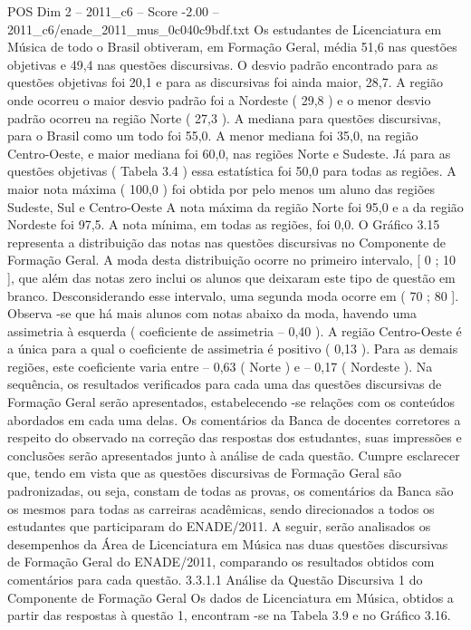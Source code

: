\begin{textsample}{POS Dim 2 – 2011\_c6 – Score -2.00 – 2011\_c6/enade\_2011\_mus\_0c040c9bdf.txt}
Os estudantes de Licenciatura em Música de todo o Brasil obtiveram, em Formação Geral, média 51,6 nas questões objetivas e 49,4 nas questões discursivas.
O desvio padrão encontrado para as questões objetivas foi 20,1 e para as discursivas foi ainda maior, 28,7.
A região onde ocorreu o maior desvio padrão foi a Nordeste ( 29,8 ) e o menor desvio padrão ocorreu na região Norte ( 27,3 ).
A mediana para questões discursivas, para o Brasil como um todo foi 55,0.
A menor mediana foi 35,0, na região Centro-Oeste, e maior mediana foi 60,0, nas regiões Norte e Sudeste.
Já para as questões objetivas ( Tabela 3.4 ) essa estatística foi 50,0 para todas as regiões.
A maior nota máxima ( 100,0 ) foi obtida por pelo menos um aluno das regiões Sudeste, Sul e Centro-Oeste A nota máxima da região Norte foi 95,0 e a da região Nordeste foi 97,5.
A nota mínima, em todas as regiões, foi 0,0.
O Gráfico 3.15 representa a distribuição das notas nas questões discursivas no Componente de Formação Geral.
A moda desta distribuição ocorre no primeiro intervalo, [ 0 ; 10 ], que além das notas zero inclui os alunos que deixaram este tipo de questão em branco.
Desconsiderando esse intervalo, uma segunda moda ocorre em ( 70 ; 80 ].
Observa -se que há mais alunos com notas abaixo da moda, havendo uma assimetria à esquerda ( coeficiente de assimetria – 0,40 ).
A região Centro-Oeste é a única para a qual o coeficiente de assimetria é positivo ( 0,13 ).
Para as demais regiões, este coeficiente varia entre – 0,63 ( Norte ) e – 0,17 ( Nordeste ).
Na sequência, os resultados verificados para cada uma das questões discursivas de Formação Geral serão apresentados, estabelecendo -se relações com os conteúdos abordados em cada uma delas.
Os comentários da Banca de docentes corretores a respeito do observado na correção das respostas dos estudantes, suas impressões e conclusões serão apresentados junto à análise de cada questão.
Cumpre esclarecer que, tendo em vista que as questões discursivas de Formação Geral são padronizadas, ou seja, constam de todas as provas, os comentários da Banca são os mesmos para todas as carreiras acadêmicas, sendo direcionados a todos os estudantes que participaram do ENADE/2011.
A seguir, serão analisados os desempenhos da Área de Licenciatura em Música nas duas questões discursivas de Formação Geral do ENADE/2011, comparando os resultados obtidos com comentários para cada questão. 3.3.1.1 Análise da Questão Discursiva 1 do Componente de Formação Geral Os dados de Licenciatura em Música, obtidos a partir das respostas à questão 1, encontram -se na Tabela 3.9 e no Gráfico 3.16.

\end{textsample}
